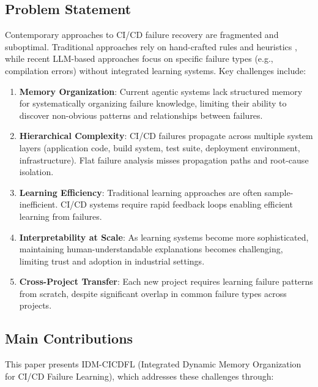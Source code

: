 \documentclass[11pt]{article}
\begin{document}
\subsection{Problem Statement}

Contemporary approaches to CI/CD failure recovery are fragmented and suboptimal. Traditional approaches rely on hand-crafted rules and heuristics \citep{Fu2025}, while recent LLM-based approaches focus on specific failure types (e.g., compilation errors) without integrated learning systems. Key challenges include:

\begin{enumerate}
    \item \textbf{Memory Organization}: Current agentic systems lack structured memory for systematically organizing failure knowledge, limiting their ability to discover non-obvious patterns and relationships between failures.

    \item \textbf{Hierarchical Complexity}: CI/CD failures propagate across multiple system layers (application code, build system, test suite, deployment environment, infrastructure). Flat failure analysis misses propagation paths and root-cause isolation.

    \item \textbf{Learning Efficiency}: Traditional learning approaches are often sample-inefficient. CI/CD systems require rapid feedback loops enabling efficient learning from failures.

    \item \textbf{Interpretability at Scale}: As learning systems become more sophisticated, maintaining human-understandable explanations becomes challenging, limiting trust and adoption in industrial settings.

    \item \textbf{Cross-Project Transfer}: Each new project requires learning failure patterns from scratch, despite significant overlap in common failure types across projects.
\end{enumerate}

\subsection{Main Contributions}

This paper presents IDM-CICDFL (Integrated Dynamic Memory Organization for CI/CD Failure Learning), which addresses these challenges through:
\end{document}
